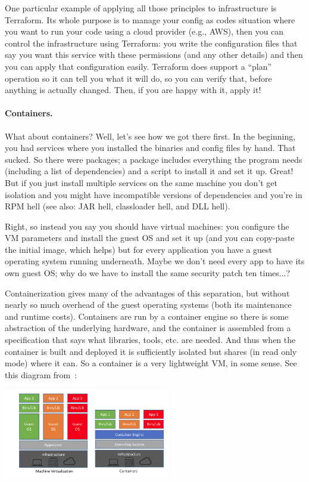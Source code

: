 \documentclass[a4paper]{report}
\begin{document}
One particular example of applying all those principles to infrastructure
is Terraform. Its whole purpose is to manage your config as codes
situation where you want to run your code using a cloud provider (e.g., AWS), 
then you can control the infrastructure using Terraform: you write the
configuration files that say you want this service with these permissions
(and any other details) and then you can apply that configuration easily.
Terraform does support a ``plan'' operation so it can tell you what it will
do, so you can verify that, before anything is actually changed. Then, if 
you are happy with it, apply it! 

\paragraph{Containers.} What about containers? Well, let's see how we got there first. In the beginning, you had services where you installed the binaries and config files by hand. That sucked. So there were packages; a package includes everything the program needs (including a list of dependencies) and a script to install it and set it up. Great! But if you just install multiple services on the same machine you don't get isolation and you might have incompatible versions of dependencies and you're in RPM hell (see also: JAR hell, classloader hell, and DLL hell).

Right, so instead you say you should have virtual machines: you configure the VM parameters and install the guest OS and set it up (and you can copy-paste the initial image, which helps) but for every application you have a guest operating system running underneath. Maybe we don't need every app to have its own guest OS; why do we have to install the same security patch ten times...?

Containerization gives many of the advantages of this separation, but without nearly so much overhead of the guest operating systems (both its maintenance and runtime costs). Containers are run by a container engine so there is some abstraction of the underlying hardware, and the container is assembled from a specification that says what libraries, tools, etc. are needed. And thus when the container is built and deployed it is sufficiently isolated but shares (in read only mode) where it can. So a container is a very lightweight VM, in some sense. See this diagram from~\cite{netappcontainer}:

\begin{center}
	\includegraphics[width=0.55\textwidth]{images/cvm.png}
\end{center}
\end{document}
